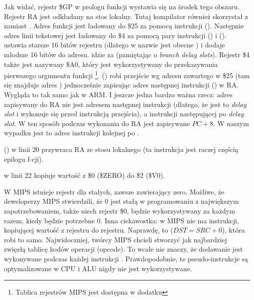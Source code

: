 

Jak widać, rejestr \$GP w prologu funkcji wystawia się na środek tego obszaru.
Rejestr \ac{RA} jest odkładany na stos lokalny.
Tutaj kompilator również skorzystał z \puts zamiast \printf.
Adres funkcji \puts jest ładowany do \$25 za pomocą instrukcji  ().
Następnie adres linii tekstowej jest ładowany do \$4 za pomocą pary instrukcji  () i
 ().
 ustawia starsze 16 bitów rejestru (dlatego w nazwie jest obecne ) i 
dodaje młodsze 16 bitów do adresu.
 idzie za  (pamiętając o \emph{branch delay slots}).
Rejestr \$4 także jest nazywany \$A0, który jest wykorzystywany do przekazywania pierwszego argumentu funkcji
\footnote{Tablica rejestrów MIPS jest dostępna w dodatku }.
 () robi przejście wg adresu zawartego w \$25 (tam się znajduje adres \puts) 
jednocześnie zapisując adres następnej instrukcji () w \ac{RA}.
Wygląda to tak samo jak w ARM.
I jeszcze jedna bardzo ważna rzecz: adres zapisywany do \ac{RA} nie jest adresem następnej instrukcji (dlatego, że jest to
\emph{delay slot} i wykonuje się przed instrukcją przejścia),
a instrukcji następującej po \emph{delay slot}.
W ten sposób podczas wykonania  do \ac{RA} jest zapisywane $PC + 8$.
W naszym wypadku jest to adres instrukcji  kolejnej po .

 () w linii 20 przywraca \ac{RA} ze stosu lokalnego (ta instrukcja jest raczej częścią epilogu f-cji).

 w linii 22 kopiuje wartość z \$0 (\$ZERO) do \$2 (\$V0).

\label{MIPS_zero_register}
W MIPS istnieje rejestr dla stałych, zawsze zawierający zero.
Możliwe, że deweloperzy MIPS stwierdzili, że 0 jest stałą w programowaniu z największym zapotrzebowaniem,
także niech rejestr \$0, będzie wykorzystywany za każdym razem, kiedy będzie potrzebne 0.
Inna ciekawostka: w MIPS nie ma instrukcji, kopiującej wartość z rejestru do rejestru.
Naprawdę,  to  ($DST=SRC+0$), która robi to samo.
Najwidoczniej, twórcy MIPS chcieli stworzyć jak najbardziej zwięzłą tablicę kodów operacji (opcode).
To wcale nie znaczy, że dodawanie jest wykonywane podczas każdej instrukcji .
Prawdopodobnie, te pseudo-instrukcje są optymalizowane w \ac{CPU} i \ac{ALU} nigdy nie jest wykorzystywane.

